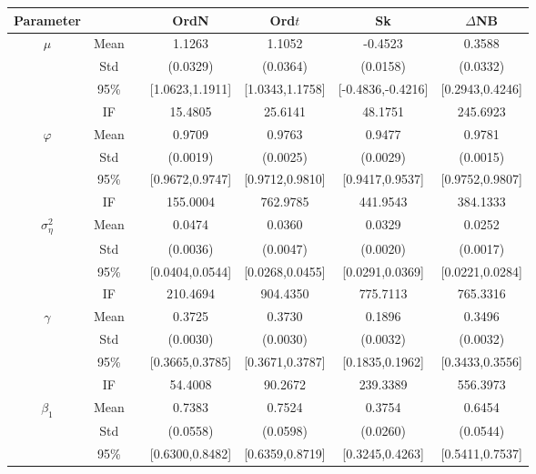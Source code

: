 \begin{table} 
\center 
\begin{footnotesize}
\tabcolsep=0.07cm
\begin{singlespace}
\begin{tabular}{ccc cccc } 
\toprule 
Parameter &&& OrdN  & Ord$t$ & Sk & $\Delta$NB \\ \hline
 $\mu$   & Mean   &  &  1.1263  &  1.1052  &  -0.4523  &  0.3588  \\  
 & Std   &  &  (0.0329)  &  (0.0364)  &  (0.0158)  &  (0.0332)  \\  
 & 95\%  &  &  [1.0623,1.1911]  &  [1.0343,1.1758]  &  [-0.4836,-0.4216]  &  [0.2943,0.4246]  \\  
 & IF  &  &  15.4805  &  25.6141  &  48.1751  &  245.6923  \\ [1.0ex] 
 $\varphi$   & Mean   &  &  0.9709  &  0.9763  &  0.9477  &  0.9781  \\  
 & Std   &  &  (0.0019)  &  (0.0025)  &  (0.0029)  &  (0.0015)  \\  
 & 95\%  &  &  [0.9672,0.9747]  &  [0.9712,0.9810]  &  [0.9417,0.9537]  &  [0.9752,0.9807]  \\  
 & IF  &  &  155.0004  &  762.9785  &  441.9543  &  384.1333  \\ [1.0ex] 
 $\sigma^2_{\eta}$   & Mean   &  &  0.0474  &  0.0360  &  0.0329  &  0.0252  \\  
 & Std   &  &  (0.0036)  &  (0.0047)  &  (0.0020)  &  (0.0017)  \\  
 & 95\%  &  &  [0.0404,0.0544]  &  [0.0268,0.0455]  &  [0.0291,0.0369]  &  [0.0221,0.0284]  \\  
 & IF  &  &  210.4694  &  904.4350  &  775.7113  &  765.3316  \\ [1.0ex] 
 $\gamma$   & Mean   &  &  0.3725  &  0.3730  &  0.1896  &  0.3496  \\  
 & Std   &  &  (0.0030)  &  (0.0030)  &  (0.0032)  &  (0.0032)  \\  
 & 95\%  &  &  [0.3665,0.3785]  &  [0.3671,0.3787]  &  [0.1835,0.1962]  &  [0.3433,0.3556]  \\  
 & IF  &  &  54.4008  &  90.2672  &  239.3389  &  556.3973  \\ [1.0ex] 
 $\beta_1$   & Mean   &  &  0.7383  &  0.7524  &  0.3754  &  0.6454  \\  
 & Std   &  &  (0.0558)  &  (0.0598)  &  (0.0260)  &  (0.0544)  \\  
 & 95\%  &  &  [0.6300,0.8482]  &  [0.6359,0.8719]  &  [0.3245,0.4263]  &  [0.5411,0.7537]  \\  

\end{tabular}
\end{singlespace}
\end{footnotesize}
\end{table}
